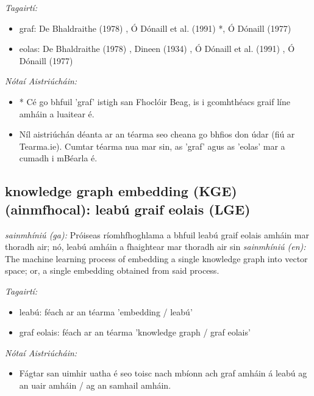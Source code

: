 \documentclass{article}
\begin{document}
 \noindent \textit{Tagairtí:}
\begin{itemize}
	\item graf: De Bhaldraithe (1978) \cite{de-bhaldraithe}, Ó Dónaill et al. (1991) \cite{focloir-beag}*, Ó Dónaill (1977) \cite{odonaill}
	\item eolas: De Bhaldraithe (1978) \cite{de-bhaldraithe}, Dineen (1934) \cite{dineen}, Ó Dónaill et al. (1991) \cite{focloir-beag}, Ó Dónaill (1977) \cite{odonaill}
\end{itemize}

 \noindent \textit{Nótaí Aistriúcháin:}
\begin{itemize}
	\item * Cé go bhfuil 'graf' istigh san Fhoclóir Beag, is i gcomhthéacs graif líne amháin a luaitear é.
	\item Níl aistriúchán déanta ar an téarma seo cheana go bhfios don údar (fiú ar Tearma.ie). Cumtar téarma nua mar sin, as 'graf' agus as 'eolas' mar a cumadh i mBéarla é.
\end{itemize}


\subsection*{knowledge graph embedding (KGE) (ainmfhocal): leabú graif eolais (LGE)} 
 \noindent \textit{sainmhíniú (ga):} Próiseas ríomhfhoghlama a bhfuil leabú graif eolais amháin mar thoradh air; nó, leabú amháin a fhaightear mar thoradh air sin
\newline\newline
 \noindent \textit{sainmhíniú (en):} The machine learning process of embedding a single knowledge graph into vector space; or, a single embedding obtained from said process.
\newline

 \noindent \textit{Tagairtí:}
\begin{itemize}
	\item leabú: féach ar an téarma 'embedding / leabú'
	\item graf eolais: féach ar an téarma 'knowledge graph / graf eolais'
\end{itemize}

 \noindent \textit{Nótaí Aistriúcháin:}
\begin{itemize}
	\item Fágtar san uimhir uatha é seo toisc nach mbíonn ach graf amháin á leabú ag an uair amháin / ag an samhail amháin.
\end{itemize}
\end{document}
